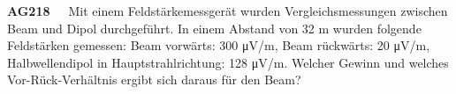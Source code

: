 \documentclass{article}
\begin{document}
\setlength{\parindent}{0pt}

\textbf{AG218}~~~Mit einem Feldstärkemessgerät wurden Vergleichsmessungen zwischen Beam und Dipol durchgeführt. In einem Abstand von 32 m wurden folgende Feldstärken gemessen: Beam vorwärts: 300 μV/m, Beam rückwärts: 20 μV/m, Halbwellendipol in Hauptstrahlrichtung: 128 μV/m. Welcher Gewinn und welches Vor-Rück-Verhältnis ergibt sich daraus für den Beam?

\vspace*{-2mm}
\end{document}
